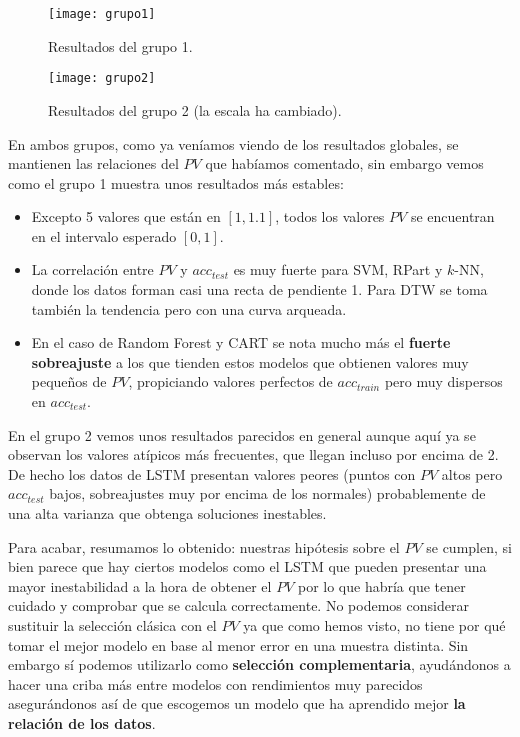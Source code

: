 \begin{figure}[htbp]
  \centering
  \hspace*{-1cm}
  \texttt{[image: grupo1]}
  \caption{Resultados del grupo 1.}
  \label{fig:pv-grupo1}
\end{figure}

\begin{figure}[htbp]
  \centering
  \hspace*{-1cm}
  \texttt{[image: grupo2]}
  \caption{Resultados del grupo 2 (la escala ha cambiado).}
  \label{fig:pv-grupo2}
\end{figure}

En ambos grupos, como ya veníamos viendo de los resultados globales, se mantienen las relaciones del $PV$ que habíamos comentado, sin embargo vemos como el grupo 1 muestra unos resultados más estables:

\begin{itemize}
  \item Excepto 5 valores que están en $[1, 1.1]$, todos los valores $PV$ se encuentran en el intervalo esperado $[0,1]$.
  \item La correlación entre $PV$ y $acc_{test}$ es muy fuerte para SVM, RPart y $k$-NN, donde los datos forman casi una recta de pendiente 1. Para DTW se toma también la tendencia pero con una curva arqueada.
  \item En el caso de Random Forest y CART se nota mucho más el \textbf{fuerte sobreajuste} a los que tienden estos modelos que obtienen valores muy pequeños de $PV$, propiciando valores perfectos de $acc_{train}$ pero muy dispersos en $acc_{test}$.
\end{itemize}

En el grupo 2 vemos unos resultados parecidos en general aunque aquí ya se observan los valores atípicos más frecuentes, que llegan incluso por encima de 2. De hecho los datos de LSTM presentan valores peores (puntos con $PV$ altos pero $acc_{test}$ bajos, sobreajustes muy por encima de los normales) probablemente de una alta varianza que obtenga soluciones inestables.

Para acabar, resumamos lo obtenido: nuestras hipótesis sobre el $PV$ se cumplen, si bien parece que hay ciertos modelos como el LSTM que pueden presentar una mayor inestabilidad a la hora de obtener el $PV$ por lo que habría que tener cuidado y comprobar que se calcula correctamente. No podemos considerar sustituir la selección clásica con el $PV$ ya que como hemos visto, no tiene por qué tomar el mejor modelo en base al menor error en una muestra distinta. Sin embargo sí podemos utilizarlo como \textbf{selección complementaria}, ayudándonos a hacer una criba más entre modelos con rendimientos muy parecidos asegurándonos así de que escogemos un modelo que ha aprendido mejor \textbf{la relación de los datos}.

